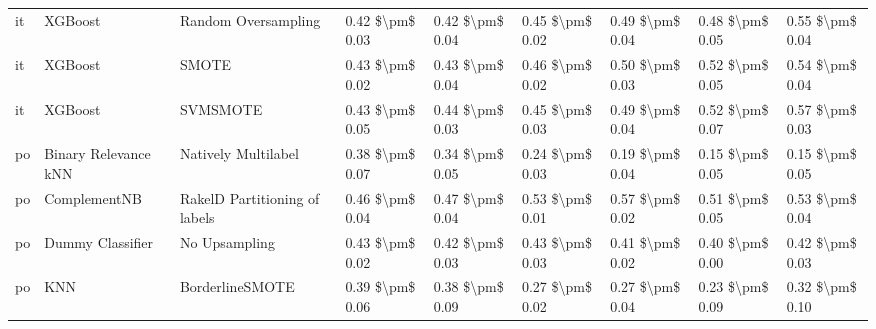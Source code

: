 \begin{tabular}{lllllllll}
      it &                         XGBoost &           Random Oversampling & 0.42 \$\textbackslash pm\$ 0.03 &           0.42 \$\textbackslash pm\$ 0.04 &       0.45 \$\textbackslash pm\$ 0.02 &        0.49 \$\textbackslash pm\$ 0.04 &                         0.48 \$\textbackslash pm\$ 0.05 &     0.55 \$\textbackslash pm\$ 0.04 \\
      it &                         XGBoost &                         SMOTE & 0.43 \$\textbackslash pm\$ 0.02 &           0.43 \$\textbackslash pm\$ 0.04 &       0.46 \$\textbackslash pm\$ 0.02 &        0.50 \$\textbackslash pm\$ 0.03 &                         0.52 \$\textbackslash pm\$ 0.05 &     0.54 \$\textbackslash pm\$ 0.04 \\
      it &                         XGBoost &                      SVMSMOTE & 0.43 \$\textbackslash pm\$ 0.05 &           0.44 \$\textbackslash pm\$ 0.03 &       0.45 \$\textbackslash pm\$ 0.03 &        0.49 \$\textbackslash pm\$ 0.04 &                         0.52 \$\textbackslash pm\$ 0.07 &     0.57 \$\textbackslash pm\$ 0.03 \\
      po &            Binary Relevance kNN &           Natively Multilabel & 0.38 \$\textbackslash pm\$ 0.07 &           0.34 \$\textbackslash pm\$ 0.05 &       0.24 \$\textbackslash pm\$ 0.03 &        0.19 \$\textbackslash pm\$ 0.04 &                         0.15 \$\textbackslash pm\$ 0.05 &     0.15 \$\textbackslash pm\$ 0.05 \\
      po &                    ComplementNB & RakelD Partitioning of labels & 0.46 \$\textbackslash pm\$ 0.04 &           0.47 \$\textbackslash pm\$ 0.04 &       0.53 \$\textbackslash pm\$ 0.01 &        0.57 \$\textbackslash pm\$ 0.02 &                         0.51 \$\textbackslash pm\$ 0.05 &     0.53 \$\textbackslash pm\$ 0.04 \\
      po &                Dummy Classifier &                 No Upsampling & 0.43 \$\textbackslash pm\$ 0.02 &           0.42 \$\textbackslash pm\$ 0.03 &       0.43 \$\textbackslash pm\$ 0.03 &        0.41 \$\textbackslash pm\$ 0.02 &                         0.40 \$\textbackslash pm\$ 0.00 &     0.42 \$\textbackslash pm\$ 0.03 \\
      po &                             KNN &               BorderlineSMOTE & 0.39 \$\textbackslash pm\$ 0.06 &           0.38 \$\textbackslash pm\$ 0.09 &       0.27 \$\textbackslash pm\$ 0.02 &        0.27 \$\textbackslash pm\$ 0.04 &                         0.23 \$\textbackslash pm\$ 0.09 &     0.32 \$\textbackslash pm\$ 0.10 \\

\end{tabular}

